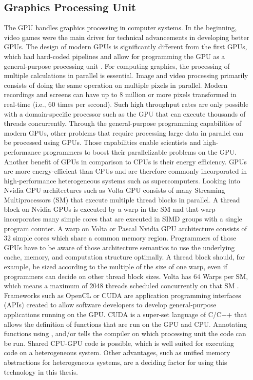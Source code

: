 \subsection{Graphics Processing Unit}
The GPU handles graphics processing in computer systems. In the beginning, video games were the main driver for technical advancements in developing better GPUs. The design of modern GPUs is significantly different from the first GPUs, which had hard-coded pipelines and allow for programming the GPU as a general-purpose processing unit \cite{nickollsGPUComputingEra2010}. For computing graphics, the processing of multiple calculations in parallel is essential. Image and video processing primarily consists of doing the same operation on multiple pixels in parallel. Modern recordings and screens can have up to 8 million or more pixels transformed in real-time (i.e., 60 times per second). Such high throughput rates are only possible with a domain-specific processor such as the GPU that can execute thousands of threads concurrently.
Through the general-purpose programming capabilities of modern GPUs, other problems that require processing large data in parallel can be processed using GPUs. Those capabilities enable scientists and high-performance programmers to boost their parallelizable problems on the GPU.
Another benefit of GPUs in comparison to CPUs is their energy efficiency. GPUs are more energy-efficient than CPUs and are therefore commonly incorporated in high-performance heterogeneous systems such as supercomputers.
Looking into Nvidia GPU architectures such as Volta \cite{NVIDIATESLAV1002017} GPU consists of many Streaming Multiprocessors (SM) that execute multiple thread blocks in parallel. A thread block on Nvidia GPUs is executed by a warp in the SM and that warp incorporates many simple cores that are executed in SIMD groups with a single program counter. A warp on Volta or Pascal Nvidia GPU architecture consists of 32 simple cores which share a common memory region. Programmers of those GPUs have to be aware of those architecture semantics to use the underlying cache, memory, and computation structure optimally. A thread block should, for example, be sized according to the multiple of the size of one warp, even if programmers can decide on other thread block sizes. Volta has 64 Warps per SM, which means a maximum of 2048 threads scheduled concurrently on that SM \cite{NVIDIATESLAV1002017}.
Frameworks such as OpenCL or CUDA are application programming interfaces (APIs) created to allow software developers to develop general-purpose applications running on the GPU. CUDA is a super-set language of C/C++ that allows the definition of functions that are run on the GPU and CPU. Annotating functions using \texttt{}, \texttt{} and/or \texttt{} tells the compiler on which processing unit the code can be run. Shared CPU-GPU code is possible, which is well suited for executing code on a heterogeneous system. Other advantages, such as unified memory abstractions for heterogeneous systems, are a deciding factor for using this technology in this thesis.


